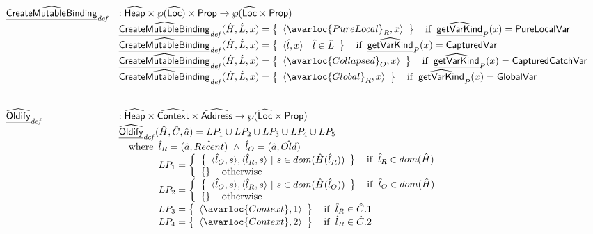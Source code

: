 \[
\begin{array}{ll}
  \ahf{CreateMutableBinding}_{\it def} & : \aHeap \times \powerset{\aLoc} \times \SF{Prop} \rightarrow \powerset{\aLoc \times \SF{Prop}}\\
  & \ahf{CreateMutableBinding}_{\it def}(\hat{H},\hat{L}, x) = \set{\langle\avarloc{PureLocal}_R,x\rangle}\quad\ifc{\ahf{getVarKind}_P(x) = \SF{PureLocalVar}}\\
  & \ahf{CreateMutableBinding}_{\it def}(\hat{H},\hat{L}, x) = \set{\langle\hat{l},x\rangle~|~\hat{l}\in\hat{L}}\quad\ifc{\ahf{getVarKind}_P(x) = \SF{CapturedVar}}\\
  & \ahf{CreateMutableBinding}_{\it def}(\hat{H},\hat{L}, x) = \set{\langle\avarloc{Collapsed}_O,x\rangle}\quad\ifc{\ahf{getVarKind}_P(x) = \SF{CapturedCatchVar}}\\
  & \ahf{CreateMutableBinding}_{\it def}(\hat{H},\hat{L}, x) = \set{\langle\avarloc{Global}_R,x\rangle}\quad\ifc{\ahf{getVarKind}_P(x) = \SF{GlobalVar}}\\
\\\\
  \ahf{Oldify}_{\it def} & : \aHeap \times \abs{Context} \times \abs{Address} \rightarrow \powerset{\aLoc \times \SF{Prop}}\\
  & \ahf{Oldify}_{\it def}(\hat{H},\hat{C},\hat{a}) = LP_1 \cup LP_2 \cup LP_3\cup LP_4 \cup LP_5\\
  & \quad\wherec{
    \hat{l}_R = (\hat{a}, \hat{Recent})\ \land\ \hat{l}_O = (\hat{a}, \hat{Old})\\
    LP_1 = \left\{
      \begin{array}{l}
      \set{ \langle\hat{l}_O,s\rangle, \langle\hat{l}_R,s\rangle ~|~ s\in dom(\hat{H}(\hat{l}_R))} \quad\ifc{\hat{l}_R \in dom(\hat{H})} \\
      \set{} \quad\owc
      \end{array}
    \right.\\
    LP_2 = \left\{
      \begin{array}{l}
      \set{ \langle\hat{l}_O,s\rangle, \langle\hat{l}_R,s\rangle ~|~ s\in dom(\hat{H}(\hat{l}_O))} \quad\ifc{\hat{l}_O \in dom(\hat{H})} \\
      \set{} \quad\owc
      \end{array}
    \right.\\
    LP_3 = \set{ \langle\avarloc{Context}, 1\rangle } \quad\ifc{\hat{l}_R\in\hat{C}.1} \\
    LP_4 = \set{ \langle\avarloc{Context}, 2\rangle } \quad\ifc{\hat{l}_R\in\hat{C}.2} \\
}
\end{array}\]
